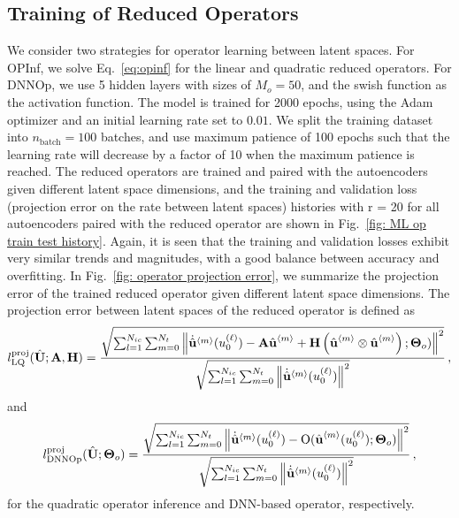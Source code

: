 \subsection{Training of Reduced Operators}
We consider two strategies for operator learning between latent spaces. For OPInf, we solve Eq.~\eqref{eq:opinf} for the linear and quadratic reduced operators. For DNNOp, we use 5 hidden layers with sizes of $M_o = 50$, and the swish function as the activation function. The model is trained for 2000 epochs, using the Adam optimizer and an initial learning rate set to $0.01$. We split the training dataset into $n_{\text{batch}} = 100$ batches, and use maximum patience of 100 epochs such that the learning rate will decrease by a factor of 10 when the maximum patience is reached. The reduced operators are trained and paired with the autoencoders given different latent space dimensions, and the training and validation loss (projection error on the rate between latent spaces) histories with r = 20 for all autoencoders paired with the reduced operator are shown in Fig.~\ref{fig: ML op train test history}. Again, it is seen that the training and validation losses exhibit very similar trends and magnitudes, with a good balance between accuracy and overfitting. In Fig.~\ref{fig: operator projection error}, we summarize the projection error of the trained reduced operator given different latent space dimensions. The projection error between latent spaces of the reduced operator is defined as
\begin{align}
    l^{\text{proj}}_{\text{LQ}}(\hat{\textbf{U}}; \textbf{A}, \textbf{H}) = \frac{\sqrt{\sum_{l=1}^{N_{ic}}\sum_{m=0}^{N_t}{\left\lVert\dot{\hat{\textbf{u}}}^{\left<m\right>}(u_0^{(\ell)}) - \textbf{A}\hat{\textbf{u}}^{\left<m\right>} + \textbf{H} \left(\hat{\textbf{u}}^{\left<m\right>} \otimes \hat{\textbf{u}}^{\left<m\right>}\right); \boldsymbol{\Theta}_o)\right\rVert}^2}}{\sqrt{\sum_{l=1}^{N_{ic}}\sum_{m=0}^{N_t}{\left\lVert\dot{\hat{\textbf{u}}}^{\left<m\right>}(u_0^{(\ell)})\right\rVert}^2}}\,,
\end{align}
and
\begin{align}
    l^{\text{proj}}_{\text{DNNOp}}(\hat{\textbf{U}}; \boldsymbol{\Theta}_o) = \frac{\sqrt{\sum_{l=1}^{N_{ic}}\sum_{m=0}^{N_t}{\left\lVert\dot{\hat{\textbf{u}}}^{\left<m\right>}(u_0^{(\ell)}) - \text{O}(\hat{\textbf{u}}^{\left<m\right>}(u_0^{(\ell)}); \boldsymbol{\Theta}_o)\right\rVert}^2}}{\sqrt{\sum_{l=1}^{N_{ic}}\sum_{m=0}^{N_t}{\left\lVert\dot{\hat{\textbf{u}}}^{\left<m\right>}(u_0^{(\ell)})\right\rVert}^2}}\,,
\end{align}
for the quadratic operator inference and DNN-based operator, respectively.

